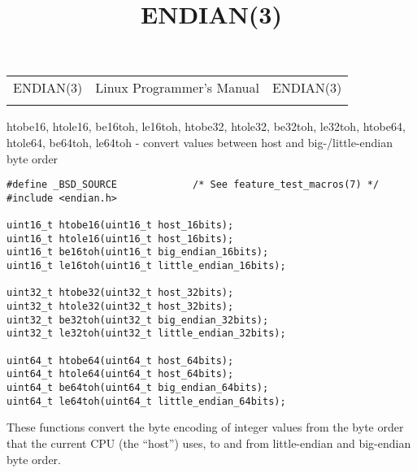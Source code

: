 \documentclass[]{article}
\title{ENDIAN(3)}
\author{}
\date{}
\begin{document}
\maketitle

\begin{longtable}[c]{@{}lll@{}}
\toprule\addlinespace
ENDIAN(3) & Linux Programmer's Manual & ENDIAN(3)
\\\addlinespace
\bottomrule
\end{longtable}


htobe16, htole16, be16toh, le16toh, htobe32, htole32, be32toh, le32toh,
htobe64, htole64, be64toh, le64toh - convert values between host and
big-/little-endian byte order


\begin{verbatim}
#define _BSD_SOURCE             /* See feature_test_macros(7) */
#include <endian.h>

uint16_t htobe16(uint16_t host_16bits);
uint16_t htole16(uint16_t host_16bits);
uint16_t be16toh(uint16_t big_endian_16bits);
uint16_t le16toh(uint16_t little_endian_16bits);

uint32_t htobe32(uint32_t host_32bits);
uint32_t htole32(uint32_t host_32bits);
uint32_t be32toh(uint32_t big_endian_32bits);
uint32_t le32toh(uint32_t little_endian_32bits);

uint64_t htobe64(uint64_t host_64bits);
uint64_t htole64(uint64_t host_64bits);
uint64_t be64toh(uint64_t big_endian_64bits);
uint64_t le64toh(uint64_t little_endian_64bits);
\end{verbatim}


These functions convert the byte encoding of integer values from the
byte order that the current CPU (the ``host'') uses, to and from
little-endian and big-endian byte order.
\end{document}
